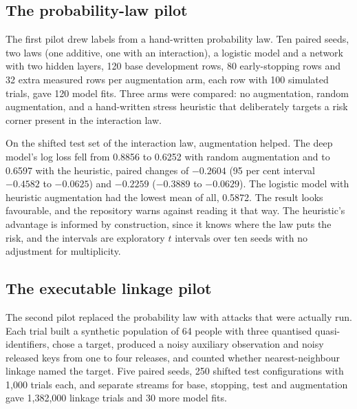 \subsection{The probability-law pilot}

The first pilot drew labels from a hand-written probability law. Ten paired seeds, two
laws (one additive, one with an interaction), a logistic model and a network with two
hidden layers, 120 base development rows, 80 early-stopping rows and 32 extra measured
rows per augmentation arm, each row with 100 simulated trials, gave 120 model fits.
Three arms were compared: no augmentation, random augmentation, and a hand-written
stress heuristic that deliberately targets a risk corner present in the interaction
law.

On the shifted test set of the interaction law, augmentation helped. The deep model's
log loss fell from 0.8856 to 0.6252 with random augmentation and to 0.6597 with the
heuristic, paired changes of $-0.2604$ (95 per cent interval $-0.4582$ to $-0.0625$) and
$-0.2259$ ($-0.3889$ to $-0.0629$). The logistic model with heuristic augmentation had
the lowest mean of all, 0.5872.
The result looks favourable, and the repository warns against reading it that way. The
heuristic's advantage is informed by construction, since it knows where the law puts
the risk, and the intervals are exploratory $t$ intervals over ten seeds with no
adjustment for multiplicity.

\subsection{The executable linkage pilot}

The second pilot replaced the probability law with attacks that were actually run.
Each trial built a synthetic population of 64 people with three quantised
quasi-identifiers, chose a target, produced a noisy auxiliary observation and noisy
released keys from one to four releases, and counted whether nearest-neighbour linkage
named the target. Five paired seeds, 250 shifted test configurations with 1{,}000
trials each, and separate streams for base, stopping, test and augmentation gave
1{,}382{,}000 linkage trials and 30 more model fits.

